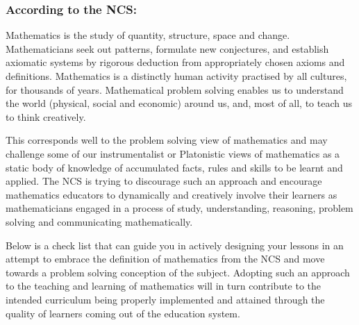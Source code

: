 \subsubsection{According to the NCS:}
Mathematics is the study of quantity, structure, space and change. Mathematicians seek out patterns, formulate new conjectures, and establish axiomatic systems by rigorous deduction from appropriately chosen axioms and definitions. Mathematics is a distinctly human activity practised by all cultures, for thousands of years. Mathematical problem solving enables us to understand the world (physical, social and economic) around us, and, most of all, to teach us to think creatively.\par

This corresponds well to the problem solving view of mathematics and may challenge some of our instrumentalist or Platonistic views of mathematics as a static body of knowledge of accumulated facts, rules and skills to be learnt and applied. The NCS is trying to discourage such an approach and encourage mathematics educators to dynamically and creatively involve their learners as mathematicians engaged in a process of study, understanding, reasoning, problem solving and communicating mathematically. \par

Below is a check list that can guide you in actively designing your lessons in an attempt to embrace the definition of mathematics from the NCS and move towards a problem solving conception of the subject. Adopting such an approach to the teaching and learning of mathematics will in turn contribute to the intended curriculum being properly implemented and attained through the quality of learners coming out of the education system. \par

